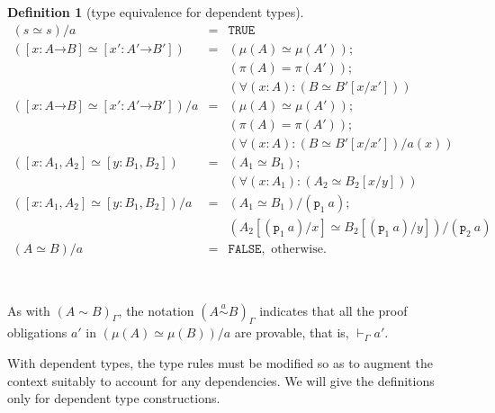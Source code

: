 \documentclass [12pt,twoside]{cslreport}
\newcommand{\thmbox}
   {{\ \hfill\hbox{%
      \vrule width1.0ex height1.0ex
   }\parfillskip 0pt }}
\newcommand{\aro}{\mathord\rightarrow} %
\newcommand{\funtype}[2]{[#1 \aro #2]}
\newcommand{\tupletype}[1]{[#1]}
\newcommand{\proj}[1]{\mathtt{p}_{#1}}
\newcommand{\tttrue}{\mathtt{TRUE}}
\newcommand{\ttfalse}{\mathtt{FALSE}}
\newcommand{\sima}{\stackrel{a}{\sim}} %
\newtheorem{definition}{Definition}
\newenvironment{Defn}[1]{\begin{definition}[#1]\label{defn:#1}}{
\thmbox\end{definition}}
\begin{document}
\begin{Defn}{type equivalence for dependent types}
\begin{eqnarray*}
  (s \simeq s)/a & = & \tttrue \\
(\funtype{x:A}{B} \simeq \funtype{x':A'}{B'}) & = & (\mu(A)\simeq
\mu(A'));\\ & & 
(\pi(A) = \pi(A'));\\ & & 
 (\forall (x : A): (B \simeq B'[x/x'])) \\
%
(\funtype{x:A}{B} \simeq \funtype{x':A'}{B'})/a & = & (\mu(A)\simeq
\mu(A'));\\ & & 
(\pi(A) = \pi(A'));\\ & & 
 (\forall (x : A): (B \simeq B'[x/x'])/a(x)) \\
%
(\tupletype{x : A_1, A_2} \simeq \tupletype{y :
B_1, B_2})
& = &
    (A_1\simeq B_1);\\ & & (\forall (x : A_1) : (A_2\simeq
B_2[x/y]))\\
%
(\tupletype{x : A_1, A_2} \simeq \tupletype{y :
B_1, B_2})/a
& = &
    (A_1\simeq B_1)/(\proj{1}~a);\\ & & (A_2[(\proj{1}~a)/x]\simeq
B_2[(\proj{1}~a)/y])/(\proj{2}~a)\\
%
 (A \simeq B)/a & = & \ttfalse, \mbox{ otherwise.}
\end{eqnarray*}
\end{Defn}
As with $(A\sim B)_\Gamma$, the notation $(A \sima 
B)_\Gamma$ indicates that  all the proof obligations $a'$ in
$(\mu(A)\simeq \mu(B))/a$ are provable, that is,  $\vdash_\Gamma a'$\@.  

With dependent types, the type rules must be modified so as to augment the
context suitably to account for any dependencies.  
We will give the definitions only for dependent type constructions.
\end{document}
